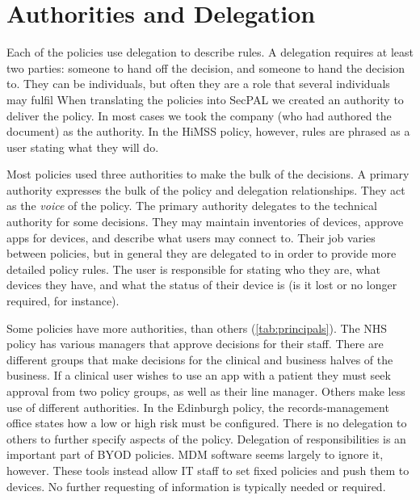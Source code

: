 \documentclass[conference,twocolumn]{IEEEtran}
\begin{document}
\section{Authorities and Delegation}

Each of the policies use delegation to describe rules.
A delegation requires at least two parties: someone to hand off the decision, and someone to hand the decision to.
They can be individuals, but often they are a role that several individuals may fulfil
When translating the policies into SecPAL we created an authority to deliver the policy.
In most cases we took the company (who had authored the document) as the authority. 
In the HiMSS policy, however, rules are phrased as a user stating what they will do.

Most policies used three authorities to make the bulk of the decisions.
A primary authority expresses the bulk of the policy and delegation relationships.
They act as the \emph{voice} of the policy.
The primary authority delegates to the technical authority for some decisions.
They may maintain inventories of devices, approve apps for devices, and describe what users may connect to.
Their job varies between policies, but in general they are delegated to in order to provide more detailed policy rules.
The user is responsible for stating who they are, what devices they have, and what the status of their device is (is it lost or no longer required, for instance).

Some policies have more authorities, than others (\autoref{tab:principals}).
The NHS policy has various managers that approve decisions for their staff.
There are different groups that make decisions for the clinical and business halves of the business.
If a clinical user wishes to use an app with a patient they must seek approval from two policy groups, as well as their line manager.
Others make less use of different authorities. 
In the Edinburgh policy, the records-management office states how a low or high risk must be configured.
There is no delegation to others to further specify aspects of the policy.
Delegation of responsibilities is an important part of BYOD policies.
MDM software seems largely to ignore it, however. 
These tools instead allow IT staff to set fixed policies and push them to devices.
No further requesting of information is typically needed or required.
\end{document}
